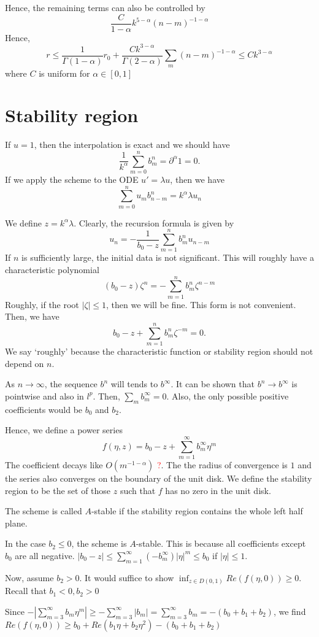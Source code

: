 \documentclass[11pt]{article}
\newcommand{\tcr}[1]{\textcolor{red}{#1}}
\begin{document}
Hence, the remaining terms can also be controlled by $$
\frac{C}{1-\alpha}k^{5-\alpha}(n-m)^{-1-\alpha}
$$
Hence, $$
r\le \frac{1}{\Gamma(1-\alpha)}r_0+\frac{Ck^{3-\alpha}}{\Gamma(2-\alpha)}\sum_m (n-m)^{-1-\alpha}\le Ck^{3-\alpha}
$$
where $C$ is uniform for $\alpha\in [0,1]$

\section{Stability region}
If $u=1$, then the interpolation is exact and we should have $$
\frac{1}{k^{\alpha}}\sum_{m=0}^n b_m^n=\partial^{\alpha}1=0.
$$
If we apply the scheme to the ODE $u'=\lambda u$, then we have $$
\sum_{m=0}^n u_{m}b^n_{n-m}=k^{\alpha}\lambda u_n
$$

We define $z=k^{\alpha}\lambda$. Clearly, the recursion formula is given by $$
u_n=-\frac{1}{b_0-z}\sum_{m=1}^{n}b_{m}^n u_{n-m}
$$
If $n$ is sufficiently large, the initial data is not significant. This will roughly have a characteristic polynomial $$
(b_0-z)\zeta^n=-\sum_{m=1}^n b_m^n \zeta^{n-m}
$$
Roughly, if the root $|\zeta|\le 1$, then we will be fine. This form is not convenient. Then, we have $$
b_0-z+\sum_{m=1}^n b_m^n\zeta^{-m}=0.
$$
We say `roughly' because the characteristic function or stability region should not depend on $n$.

As $n\to\infty$, the sequence $b^n$ will tends to $b^{\infty}$. It can be shown that $b^n\to b^{\infty}$ is pointwise and also in $l^p$. Then, $\sum_m b_m^{\infty}=0$. Also, the only possible positive coefficients would be $b_0$ and $b_2$.

Hence, we define a power series $$
f(\eta, z)=b_0-z+\sum_{m=1}^{\infty} b_m^{\infty}\eta^m
$$
 The coefficient decays like $O(m^{-1-\alpha})$ \tcr{?}. The the radius of convergence is $1$ and the series also converges on the boundary of the unit disk. We define the stability region to be the set of those $z$ such that $f$ has no zero in the unit disk.

The scheme is called $A$-stable if the stability region contains the whole left half plane.

 In the case $b_2\le 0$, the scheme is $A$-stable. This is because all coefficients except $b_0$ are all negative. $|b_0-z|\le \sum_{m=1}^{\infty}(-b_m^{\infty})|\eta|^m\le b_0$
if $|\eta|\le 1$. 

Now, assume $b_2>0$. It would suffice to show $\inf_{z\in D(0,1)}Re(f(\eta, 0))\ge 0$. Recall that $b_1<0, b_2>0$

Since $-|\sum_{m=3}^{\infty}b_m\eta^m|\ge -\sum_{m=3}^{\infty}|b_m|
=\sum_{m=3}^{\infty}b_m=-(b_0+b_1+b_2)$, we find 
 $Re(f(\eta,0))\ge b_0+Re(b_1\eta+b_2\eta^2)-(b_0+b_1+b_2)$
\end{document}
